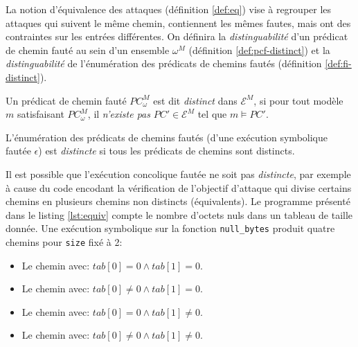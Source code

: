                 La notion d'équivalence des attaques (définition \ref{def:eq}) vise à regrouper les attaques qui suivent le même chemin, contiennent les mêmes fautes, mais ont des contraintes sur les entrées différentes.
                On définira la \textit{distinguabilité} d'un prédicat de chemin fauté au sein d'un ensemble $\omega^M$ (définition \ref{def:pcf-distinct}) et la \textit{distinguabilité} de l'énumération des prédicats de chemins fautés (définition \ref{def:fi-distinct}).  
            
                \begin{defi}
                \label{def:pcf-distinct}
                    Un prédicat de chemin fauté $PC^M_{\omega}$ est dit \textit{distinct} dans $\mathcal{E}^M$, si pour tout modèle $m$ satisfaisant $PC^M_{\omega}$, il \textit{n'existe pas} $PC' \in \mathcal{E}^M$ tel que $m \vDash PC'$.
                \end{defi}
                
                
                \begin{defi}
                \label{def:fi-distinct}
                    L'énumération des prédicats de chemins fautés (d'une exécution symbolique fautée $\epsilon$) est \textit{distincte} si tous les prédicats de chemins sont distincts.
                \end{defi}
                
                Il est possible que l'exécution concolique fautée ne soit pas \textit{distincte}, par exemple à cause du code encodant la vérification de l'objectif d'attaque qui divise certains chemins en plusieurs chemins non distincts (équivalents).
                Le programme présenté dans le listing \ref{lst:equiv} compte le nombre d'octets nuls dans un tableau de taille donnée. 
                Une exécution symbolique sur la fonction \texttt{null\_bytes} produit quatre chemins pour \texttt{size} fixé à 2:
                \begin{itemize}
                    \item Le chemin avec: $tab[0] = 0 \land tab[1] = 0 $.
                    \item Le chemin avec: $tab[0] \neq 0 \land tab[1] = 0 $.
                    \item Le chemin avec: $tab[0] = 0 \land tab[1] \neq 0 $.
                    \item Le chemin avec: $tab[0] \neq 0 \land tab[1] \neq 0 $.
                \end{itemize}
                
